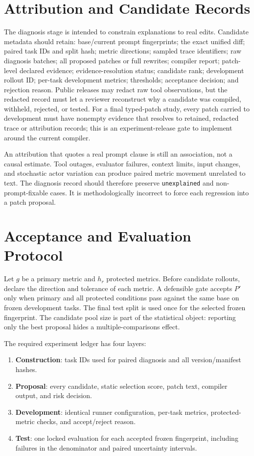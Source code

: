 \documentclass[10pt]{article}
\begin{document}
\section{Attribution and Candidate Records}
The diagnosis stage is intended to constrain explanations to real edits. Candidate metadata should retain: base/current prompt fingerprints; the exact unified diff; paired task IDs and split hash; metric directions; sampled trace identifiers; raw diagnosis batches; all proposed patches or full rewrites; compiler report; patch-level declared evidence; evidence-resolution status; candidate rank; development rollout ID; per-task development metrics; thresholds; acceptance decision; and rejection reason. Public releases may redact raw tool observations, but the redacted record must let a reviewer reconstruct why a candidate was compiled, withheld, rejected, or tested. For a final typed-patch study, every patch carried to development must have nonempty evidence that resolves to retained, redacted trace or attribution records; this is an experiment-release gate to implement around the current compiler.

An attribution that quotes a real prompt clause is still an association, not a causal estimate. Tool outages, evaluator failures, context limits, input changes, and stochastic actor variation can produce paired metric movement unrelated to text. The diagnosis record should therefore preserve \texttt{unexplained} and non-prompt-fixable cases. It is methodologically incorrect to force each regression into a patch proposal.

\section{Acceptance and Evaluation Protocol}
Let $g$ be a primary metric and $h_r$ protected metrics. Before candidate rollouts, declare the direction and tolerance of each metric. A defensible gate accepts $P'$ only when primary and all protected conditions pass against the same base on frozen development tasks. The final test split is used once for the selected frozen fingerprint. The candidate pool size is part of the statistical object: reporting only the best proposal hides a multiple-comparisons effect.

The required experiment ledger has four layers:
\begin{enumerate}
\item \textbf{Construction}: task IDs used for paired diagnosis and all version/manifest hashes.
\item \textbf{Proposal}: every candidate, static selection score, patch text, compiler output, and risk decision.
\item \textbf{Development}: identical runner configuration, per-task metrics, protected-metric checks, and accept/reject reason.
\item \textbf{Test}: one locked evaluation for each accepted frozen fingerprint, including failures in the denominator and paired uncertainty intervals.
\end{enumerate}
\end{document}
